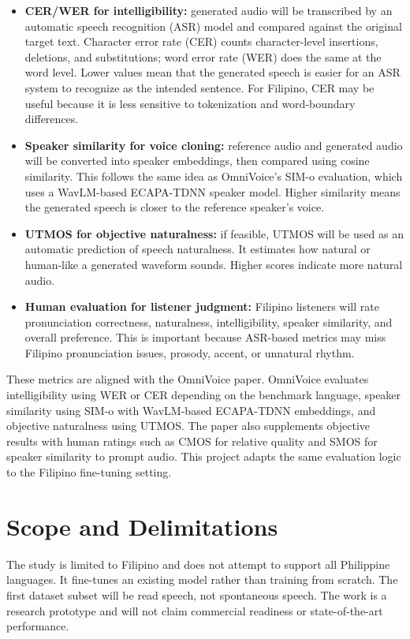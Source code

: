 \documentclass[11pt]{article}
\begin{document}
\begin{itemize}
  \item \textbf{CER/WER for intelligibility:} generated audio will be transcribed by an automatic speech recognition (ASR) model and compared against the original target text. Character error rate (CER) counts character-level insertions, deletions, and substitutions; word error rate (WER) does the same at the word level. Lower values mean that the generated speech is easier for an ASR system to recognize as the intended sentence. For Filipino, CER may be useful because it is less sensitive to tokenization and word-boundary differences.
  \item \textbf{Speaker similarity for voice cloning:} reference audio and generated audio will be converted into speaker embeddings, then compared using cosine similarity. This follows the same idea as OmniVoice's SIM-o evaluation, which uses a WavLM-based ECAPA-TDNN speaker model. Higher similarity means the generated speech is closer to the reference speaker's voice.
  \item \textbf{UTMOS for objective naturalness:} if feasible, UTMOS will be used as an automatic prediction of speech naturalness. It estimates how natural or human-like a generated waveform sounds. Higher scores indicate more natural audio.
  \item \textbf{Human evaluation for listener judgment:} Filipino listeners will rate pronunciation correctness, naturalness, intelligibility, speaker similarity, and overall preference. This is important because ASR-based metrics may miss Filipino pronunciation issues, prosody, accent, or unnatural rhythm.
\end{itemize}

These metrics are aligned with the OmniVoice paper. OmniVoice evaluates intelligibility using WER or CER depending on the benchmark language, speaker similarity using SIM-o with WavLM-based ECAPA-TDNN embeddings, and objective naturalness using UTMOS. The paper also supplements objective results with human ratings such as CMOS for relative quality and SMOS for speaker similarity to prompt audio. This project adapts the same evaluation logic to the Filipino fine-tuning setting.

\section{Scope and Delimitations}

The study is limited to Filipino and does not attempt to support all Philippine languages. It fine-tunes an existing model rather than training from scratch. The first dataset subset will be read speech, not spontaneous speech. The work is a research prototype and will not claim commercial readiness or state-of-the-art performance.
\end{document}
